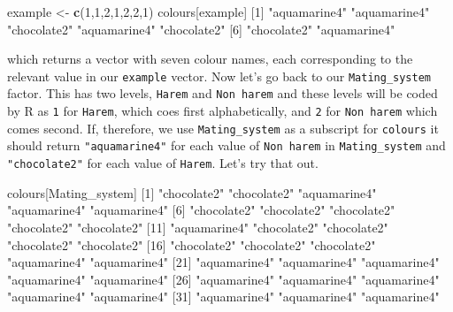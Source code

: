 \documentclass[
]{book}
\newenvironment{Shaded}{\begin{snugshade}}{\end{snugshade}}
\newcommand{\DecValTok}[1]{\textcolor[rgb]{0.00,0.00,0.81}{#1}}
\newcommand{\KeywordTok}[1]{\textcolor[rgb]{0.13,0.29,0.53}{\textbf{#1}}}
\newcommand{\NormalTok}[1]{#1}
\newcommand{\StringTok}[1]{\textcolor[rgb]{0.31,0.60,0.02}{#1}}
\begin{document}
\begin{Shaded}
\begin{Highlighting}[]
\NormalTok{example <-}\StringTok{ }\KeywordTok{c}\NormalTok{(}\DecValTok{1}\NormalTok{,}\DecValTok{1}\NormalTok{,}\DecValTok{2}\NormalTok{,}\DecValTok{1}\NormalTok{,}\DecValTok{2}\NormalTok{,}\DecValTok{2}\NormalTok{,}\DecValTok{1}\NormalTok{)}
\NormalTok{colours[example]}
\NormalTok{[}\DecValTok{1}\NormalTok{] }\StringTok{"aquamarine4"} \StringTok{"aquamarine4"} \StringTok{"chocolate2"}  \StringTok{"aquamarine4"} \StringTok{"chocolate2"} 
\NormalTok{[}\DecValTok{6}\NormalTok{] }\StringTok{"chocolate2"}  \StringTok{"aquamarine4"}
\end{Highlighting}
\end{Shaded}

which returns a vector with seven colour names, each corresponding to the relevant value in our \texttt{example} vector. Now let's go back to our \texttt{Mating\_system} factor. This has two levels, \texttt{Harem} and \texttt{Non\ harem} and these levels will be coded by R as \texttt{1} for \texttt{Harem}, which coes first alphabetically, and \texttt{2} for \texttt{Non\ harem} which comes second. If, therefore, we use \texttt{Mating\_system} as a subscript for \texttt{colours} it should return \texttt{"aquamarine4"} for each value of \texttt{Non\ harem} in \texttt{Mating\_system} and \texttt{"chocolate2"} for each value of \texttt{Harem}. Let's try that out.

\begin{Shaded}
\begin{Highlighting}[]
\NormalTok{colours[Mating_system]}
\NormalTok{ [}\DecValTok{1}\NormalTok{] }\StringTok{"chocolate2"}  \StringTok{"chocolate2"}  \StringTok{"aquamarine4"} \StringTok{"aquamarine4"} \StringTok{"aquamarine4"}
\NormalTok{ [}\DecValTok{6}\NormalTok{] }\StringTok{"chocolate2"}  \StringTok{"chocolate2"}  \StringTok{"chocolate2"}  \StringTok{"chocolate2"}  \StringTok{"chocolate2"} 
\NormalTok{[}\DecValTok{11}\NormalTok{] }\StringTok{"aquamarine4"} \StringTok{"chocolate2"}  \StringTok{"chocolate2"}  \StringTok{"chocolate2"}  \StringTok{"chocolate2"} 
\NormalTok{[}\DecValTok{16}\NormalTok{] }\StringTok{"chocolate2"}  \StringTok{"chocolate2"}  \StringTok{"chocolate2"}  \StringTok{"aquamarine4"} \StringTok{"aquamarine4"}
\NormalTok{[}\DecValTok{21}\NormalTok{] }\StringTok{"aquamarine4"} \StringTok{"aquamarine4"} \StringTok{"aquamarine4"} \StringTok{"aquamarine4"} \StringTok{"aquamarine4"}
\NormalTok{[}\DecValTok{26}\NormalTok{] }\StringTok{"aquamarine4"} \StringTok{"aquamarine4"} \StringTok{"aquamarine4"} \StringTok{"aquamarine4"} \StringTok{"aquamarine4"}
\NormalTok{[}\DecValTok{31}\NormalTok{] }\StringTok{"aquamarine4"} \StringTok{"aquamarine4"} \StringTok{"aquamarine4"}
\end{Highlighting}
\end{Shaded}
\end{document}
